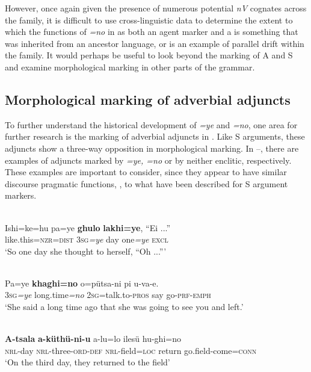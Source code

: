 \documentclass[output=paper]{LSP/langsci}
\begin{document}
However, once again given the presence of numerous potential \textit{nV} cognates across the family, it is difficult to use cross-linguistic data to determine the extent to which the functions of \textit{=no} in  as both an agent marker and a  is something that was inherited from an ancestor language, or is an example of parallel drift within the  family. It would perhaps be useful to look beyond the marking of A and S and examine morphological marking in other parts of the grammar.

\subsection{ Morphological marking of adverbial adjuncts}\label{13-te-sec:4.4}

To further understand the historical development of \textit{=ye} and \textit{=no}, one area for further research is the marking of adverbial adjuncts in . Like S arguments, these adjuncts show a three-way opposition in morphological marking. In --, there are examples of adjuncts marked by \textit{=ye, =no} or by neither enclitic, respectively. These examples are important to consider, since they appear to have similar discourse pragmatic functions, \eg {}, to what have been described for S argument markers.

\ea\label{13-te-ex:40}
\\
\gll  Ishi=ke=hu pa=ye \textbf{ghulo} \textbf{lakhi=ye}, “Ei {...}”\\
like.this=\textsc{nzr=dist} \textsc{3sg}\textit{=ye} day one\textit{=ye} \textsc{excl}\\
\glt ‘So one day she thought to herself, “Oh ...”’
\z

\ea\label{13-te-ex:41}
\\
\gll Pa=ye \textbf{khaghi=no} o=pütsa-ni pi u-va-e.\\
3\textsc{sg}\textit{=ye} long.time\textit{=no} 2\textsc{sg}=talk.to-\textsc{pros} say go-\textsc{prf}-\textsc{emph}\\
\glt ‘She said a long time ago that she was going to see you and left.’
\z

\ea\label{13-te-ex:42}
\\
\gll  \textbf{A-tsala} \textbf{a-küthü-ni-u} a-lu=lo ilesü hu-ghi=no\\
\textsc{nrl}-day \textsc{nrl}-three-\textsc{ord}-\textsc{def} \textsc{nrl}-field=\textsc{loc} return go.field-come=\textsc{conn}\\
\glt ‘On the third day, they returned to the field’
\z
\end{document}
